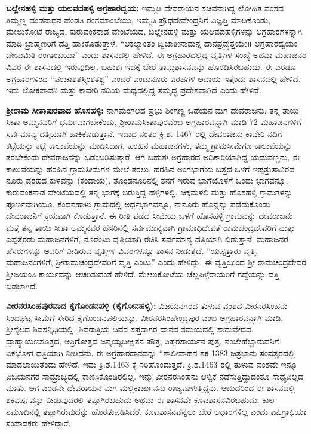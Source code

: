 \textbf{ಬಲ್ಲೇನಹಳ್ಳಿ ಮತ್ತು ಯಲವದಪಳ್ಳಿ ಅಗ್ರಹಾರದ್ವಯ: } ಇಮ್ಮಡಿ ದೇವರಾಯನ ಸಚಿವನಾಗಿದ್ದ ಲೋಹಿತ ವಂಶದ ತಿಮ್ಮಣ್ಣ ದಂಡನಾಥನ ಹೆಂಡತಿ ರಂಗಮಾಂಬೆಯು, ಇಮ್ಮಡಿ ಪ್ರೌಢದೇವೇಂದ್ರನಿಗೆ ವಿಜ್ಞಪ್ತಿ ಮಾಡಿಕೊಂಡು, ಮೇಲುಕೋಟೆ ರಾಜ್ಯದ, ಕುರುವಂಕನಾಡ ವೇಂಟೆಯದ, ಬಲ್ಲೇನಹಳ್ಳಿ ಮತ್ತು ಯಲವದಹಳ್ಳಿಗಳನ್ನು ಅಗ್ರಹಾರಗಳನ್ನಾಗಿ ಮಾಡಿ ಬ್ರಾಹ್ಮಣರಿಗೆ ದತ್ತಿ ಹಾಕಿಕೊಡುತ್ತಾಳೆ. “ಆಕಲ್ಯಾಂತಂ ದ್ವಿಜಾತೀನಾಮನ್ನ ದಾನಪ್ರವ್ರುತ್ತಯೇ॥ ಅಗ್ರಹಾರದ್ವಯಂ ದೇಯಮಿತಿ ರಂಗಾಂಬಯಾ” ಎಂದು ಶಾಸನದಲ್ಲಿ ಹೇಳಿದೆ. ಈ ಅಗ್ರಹಾರದಲ್ಲಿದ್ದ ವೃತ್ತಿಗಳ ಸಂಖ್ಯೆ ಅಥವಾ ಮಹಾಜನರ ವಿವರ ಈ ಶಾಸನದಲ್ಲಿ ಇರುವುದಿಲ್ಲ. ಬಹುಶಃ ಇದಕ್ಕೆ ಬೇರೆ ತಾಮ್ರಶಾಸನವನ್ನು ಹೊರಡಿಸಿರಬಹುದು. ಈ ಎರಡೂ ಅಗ್ರಹಾರಗಳಿಂದ “ಪಂಚಾಶತಸ್ತ್ರಿಂಶತಶ್ಚ” ಎಂದರೆ ಎಂಟುನೂರು ವರಹಗಳ ಆದಾಯ ಇತ್ತೆಂದು ಶಾಸನದಲ್ಲಿ ಹೇಳಿದೆ. ಇದು ಲೋಕಪಾವನಿ ಮತ್ತು ಕಾವೇರಿ ನದಿಯ ಮಧ್ಯದಲ್ಲಿದ್ದ ಸಮೃದ್ಧ ಪ್ರದೇಶವಾಗಿದೆ ಎಂದು ಹೇಳಿದೆ.

\textbf{ಶ‍್ರೀರಾಮ ಸೀತಾಪುರವಾದ ಹೊಸಹಳ್ಳಿ:} ನಾಗಮಂಗಲದ ಪ್ರಭು ಶಿಂಗಣ್ಣ ಒಡೆಯನ ಮಗ ದೇವರಾಜನು, ತನ್ನ ತಾಯಿ ಸೀತಾ ಅಮ್ಮನವರಿಗೆ ಧರ್ಮವಾಗಬೇಕೆಂದು, ಶ‍್ರೀರಾಮಸೀತಾಪುರವೆಂಬ ಅಗ್ರಹಾರವನ್ನಾಗಿ ಮಾಡಿ 72 ಮಹಾಜನಗಳಿಗೆ ಸರ್ವಮಾನ್ಯ ದತ್ತಿಯಾಗಿ ಹಾಕಿಕೊಡುತ್ತಾನೆ. ಇದಾದ ನಂತರ ಕ್ರಿ.ಶ. 1467 ರಲ್ಲಿ ದೇವರಾಜನು ಕಾವೇರಿ ನದಿಗೆ ಕಟ್ಟೆಯನ್ನು ಕಟ್ಟೆ ಕಾಲುವೆಯನ್ನು ಮಾಡಿಸಿದಾಗ, ಹರಹಿನ ಮಹಾಜನಗಳು, ತಮ್ಮ ಗ್ರಾಮಸೀಮೆಗೂ ಕಾಲುವೆಯನ್ನು ತರಬೇಕೆಂದು ದೇವರಾಜನನ್ನು ಒಡಂಬಡಿಸುತ್ತಾರೆ. ಆಗ ಬಹುಶಃ ಅಗ್ರಹಾರದ ಅಧಿಕಾರಿಯಾಗಿದ್ದ ಯದುವಣ್ಣನು, ಈ ಕಾಲುವೆಯನ್ನು ಹರಹಿನ ಗ್ರಾಮಸೀಮೆಗಳ ಮೇಲೆ ತರಲು, ಹರಹಿನ ಅಂಗಭಾಗೆಯ ಬತ್ತದ ಒಳಗೆ ಇಪ್ಪತ್ತುಸಾವಿರದ ನೂರು ವರಹದ ಕುಳವನ್ನು (ಕಂದಾಯ), ತೊಂಡನೂರಿನಲ್ಲಿ ತನಗೆ ಇರುವ ಭಾಗೆಯೊಳಗೆ ಒಂದು ಭಾಗವನ್ನೂ, ಕುರುವಂಕನಾಡ ವೇಂಟೆಯದಲ್ಲಿ ತನ್ನ ಭಾಗಕ್ಕೆ ಬರುತ್ತಿದ್ದ ಹಳ್ಳಿಗಳಲ್ಲಿ, ಚಿಕ್ಕಮಳಲಿ ಮತ್ತು ಹೊಸಹಳ್ಳಿ ಗ್ರಾಮಗಳನ್ನು ಪೂರ್ಣವಾಗಿಯೂ, ಕೆಂದನಹಾಳು ಗ್ರಾಮದಲ್ಲಿ ಅರ್ಧಭಾಗವನ್ನೂ, ನಾನೂರು ಹೊನ್ನನ್ನು ಪಡೆದುಕೊಂಡು ದೇವರಾಜನಿಗೆ ಕ್ರಯವಾಗಿ ಕೊಡುತ್ತಾನೆ. ಈ ರೀತಿ ಪಡೆದ ಸೀಮೆಯ ಒಳಗೆ ಹೊಸಹಳ್ಳಿ ಗ್ರಾಮವನ್ನು ದೇವರಾಜನು ಮತ್ತೆ ತನ್ನ ತಾಯಿ ಸೀತಾ ಅಮ್ಮನವರ ಹೆಸರಿನಲ್ಲಿ ಸರ್ವಮಾನ್ಯವಾಗಿ ಗ್ರಾಮಾಧಿದೇವತೆ ರಾಮಚಂದ್ರದೇವರಿಗೆ ಮತ್ತು ಎಪ್ಪತ್ತೆರಡು ಮಹಾಜನಗಳಿಗೆ, ನೂರೆಂಟು ವೃತ್ತಿಯಾಗಿ ರಚಿಸಿ ಸರ್ವಮಾನ್ಯ ದತ್ತಿಯಾಗಿ ಬಿಡುತ್ತಾನೆ. ಮಹಾಜನರ ಹೆಸರುಗಳನ್ನು ಅವರಿಗೆ ನೀಡಿರುವ ವೃತ್ತಿಗಳ ವಿವರಗಳನ್ನೂ ಶಾಸನ ನೀಡುತ್ತದೆ. “ಯಪ್ಪತ್ತಾರು ವೃತ್ತಿ, ಮಹಾಜನಂಗಳಿಗೆ, ಶ‍್ರೀರಾಮಚಂದ್ರದೇವರಿಗೆ ವೃತ್ತಿ ಎಂಟು” ಎಂದು ಹೇಳಿದ್ದು, ಈ ವೃತ್ತಿಯಿಂದ ಶ‍್ರೀ ರಾಮಚಂದ್ರದೇವರ ಶ‍್ರೀಜಯಂತಿ ಕಾರ್ಯವನ್ನು ಆಚರಿಸುವಂತೆ ಹೇಳಿದೆ. ಮೇಲುಕೋಟೆಯ ಚೆಲ್ಲಪಿಳ್ಳೆರಾಯರಿಗೆ ಗದ್ದೆಯನ್ನು ದತ್ತಿ ಬಿಡಲಾಗಿದೆ.

\textbf{ವೀರನರಸಿಂಹಪುರವಾದ ಕೈಗೊಂಡನಪಳ್ಳಿ (ಕೈಗೋನಹಳ್ಳಿ):} ವಿಜಯನಗರದ ತುಳುವ ವಂಶದ ವೀರನರಸಿಂಹನು ಸಿಂದಘಟ್ಟ ಸೀಮೆಗೆ ಸೇರಿದ ಕೈಗೊಂಡನಪಲ್ಲಿಯನ್ನು, ವೀರನರಸಿಂಹೇಂದ್ರಪುರ ಎಂಬ ಅಗ್ರಹಾರವನ್ನಾಗಿ ಮಾಡಿ, ಶ‍್ರೀಶೈಲದ ಶಿವಸನ್ನಿಧಿಯಲ್ಲಿ, ಶಿವರಾತ್ರಿಯ ದಿವಸ ಸಪ್ತಸಾಗರ ದಾನದ ಸಮಯದಲ್ಲಿ ಸಾಮವೇದದ, ದ್ರಾಹ್ಯಾಯಣಸೂತ್ರದ, ಅತ್ರಿಗೋತ್ರದ ಜನ್ನಯ್ಯದೀಕ್ಷಿತನ ಪೌತ್ರ, ತಿಪ್ಪರಸಾರ್ಯನ ಪುತ್ರ, ನಂಜೇಹೆಬ್ಬಾರುವನಿಗೆ ಏಕಭೋಗ ದತ್ತಿಯಾಗಿ ನೀಡಿದನು. ಈ ಅಗ್ರಹಾರದಾನವನ್ನು “ಶಾಲೀವಾಹನ ಶಕ 1383 ಚಿತ್ರಭಾನು ಸಂವತ್ಸರದಲ್ಲಿ ಮಾಡಲಾಯಿತೆಂದು ಹೇಳಿದೆ. ಇದು ಕ್ರಿ.ಶ.1463 ಕ್ಕೆ ಸರಿಹೊಂದುತ್ತದೆ. ಕ್ರಿ.ಶ.1463 ರಲ್ಲಿ ತುಳುವ ವಂಶವೇ ಇನ್ನೂ ವಿಜಯನಗರ ಸಾಮ್ರಾಜ್ಯದಲ್ಲಿ ಕಾಣಿಸಿಕೊಂಡಿರಲಿಲ್ಲ. ಇನ್ನು ವೀರನರಸಿಂಹನು ಆಳ್ವಿಕೆ ನಡೆಸುತ್ತಿದ್ದುದಂತೂ ಸಾಧ್ಯವಿಲ್ಲದ ಮಾತು. ಆಗ ಎರಡನೇ ದೇವರಾಯನ ಮಗ ಮಲ್ಲಿಕಾರ್ಜುನನು ರಾಜ್ಯವಾಳುತ್ತಿದ್ದನು. ಆದುದರಿಂದ ಈ ಶಾಸನದಲ್ಲಿ ಶಕವರ್ಷವನ್ನು ನೀಡುವುದರಲ್ಲಿ ತಪ್ಪಾಗಿರಬಹುದು ಅಥವಾ ಈ ಶಾಸನವೇ ಕೂಟಶಾಸನವಿರಬಹುದು. ಕಾಲ ನಮೂದಿನಲ್ಲಿ ತಪ್ಪಾಗಿರುವುದನ್ನು ಹೊರತುಪಡಿಸಿದರೆ, ಕೂಟಶಾಸನವೆನ್ನಲು ಬೇರೆ ಆಧಾರಗಳಿಲ್ಲ ಎಂದು ಎಪಿಗ್ರಾಫಿಯಾ ಸಂಪಾದಕರು ಹೇಳಿದ್ದಾರೆ. 

